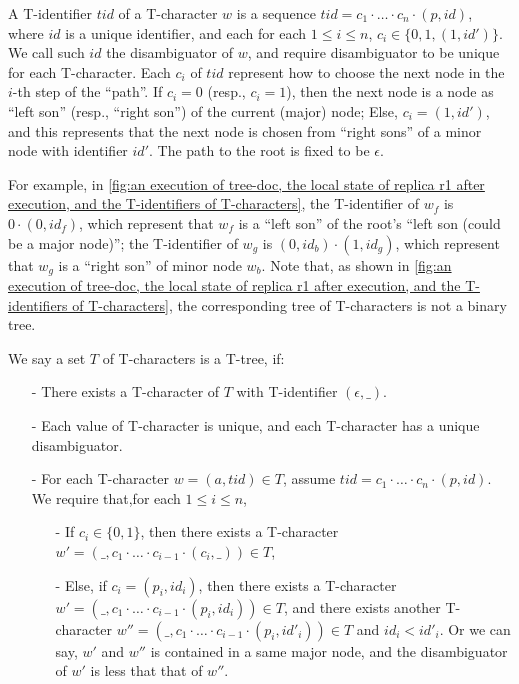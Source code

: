 A T-identifier $tid$ of a T-character $w$ is a sequence $tid = c_1 \cdot \ldots \cdot c_n \cdot (p,id)$, where $id$ is a unique identifier, and each for each $1 \leq i \leq n$, $c_i \in \{ 0,1,(1,id')\}$. We call such $id$ the disambiguator of $w$, and require disambiguator to be unique for each T-character. Each $c_i$ of $tid$ represent how to choose the next node in the $i$-th step of the ``path''. If $c_i=0$ (resp., $c_i=1$), then the next node is a node as ``left son'' (resp., ``right son'') of the current (major) node; Else, $c_i = (1,id')$, and this represents that the next node is chosen from ``right sons'' of a minor node with identifier $id'$. The path to the root is fixed to be $\epsilon$.

For example, in \autoref{fig:an execution of tree-doc, the local state of replica r1 after execution, and the T-identifiers of T-characters}, the T-identifier of $w_f$ is $0 \cdot (0,id_f)$, which represent that $w_f$ is a ``left son'' of the root's ``left son (could be a major node)''; the T-identifier of $w_g$ is $(0,id_b) \cdot (1,id_g)$, which represent that $w_g$ is a ``right son'' of minor node $w_b$. Note that, as shown in \autoref{fig:an execution of tree-doc, the local state of replica r1 after execution, and the T-identifiers of T-characters}, the corresponding tree of T-characters is not a binary tree.

We say a set $T$ of T-characters is a T-tree, if:

\begin{itemize}
\setlength{\itemsep}{0.5pt}
\item[-] There exists a T-character of $T$ with T-identifier $(\epsilon,\_)$.

\item[-] Each value of T-character is unique, and each T-character has a unique disambiguator.

\item[-] For each T-character $w=(a,tid) \in T$, assume $tid = c_1 \cdot \ldots \cdot c_n \cdot (p,id)$. We require that,for each $1 \leq i \leq n$,

    \begin{itemize}
    \setlength{\itemsep}{0.5pt}
    \item[-] If $c_i \in \{ 0,1 \}$, then there exists a T-character $w' = (\_, c_1 \cdot \ldots \cdot c_{i-1} \cdot (c_i,\_) ) \in T$,

    \item[-] Else, if $c_i = (p_i,id_i)$, then there exists a T-character $w' = (\_, c_1 \cdot \ldots \cdot c_{i-1} \cdot (p_i,id_i) ) \in T$, and there exists another T-character $w'' = (\_, c_1 \cdot \ldots \cdot c_{i-1} \cdot (p_i,id'_i) ) \in T$ and $id_i < id'_i$. Or we can say, $w'$ and $w''$ is contained in a same major node, and the disambiguator of $w'$ is less that that of $w''$.
    \end{itemize}
\end{itemize}


